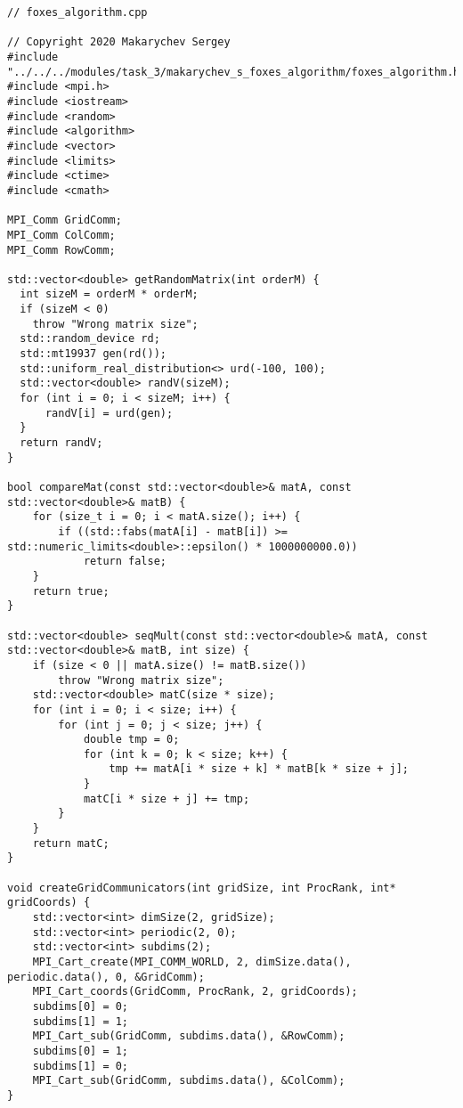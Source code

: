 \documentclass{report}
\begin{document}
\begin{lstlisting}
// foxes_algorithm.cpp

// Copyright 2020 Makarychev Sergey
#include "../../../modules/task_3/makarychev_s_foxes_algorithm/foxes_algorithm.h"
#include <mpi.h>
#include <iostream>
#include <random>
#include <algorithm>
#include <vector>
#include <limits>
#include <ctime>
#include <cmath>

MPI_Comm GridComm;
MPI_Comm ColComm;
MPI_Comm RowComm;

std::vector<double> getRandomMatrix(int orderM) {
  int sizeM = orderM * orderM;
  if (sizeM < 0)
    throw "Wrong matrix size";
  std::random_device rd;
  std::mt19937 gen(rd());
  std::uniform_real_distribution<> urd(-100, 100);
  std::vector<double> randV(sizeM);
  for (int i = 0; i < sizeM; i++) {
      randV[i] = urd(gen);
  }
  return randV;
}

bool compareMat(const std::vector<double>& matA, const std::vector<double>& matB) {
    for (size_t i = 0; i < matA.size(); i++) {
        if ((std::fabs(matA[i] - matB[i]) >= std::numeric_limits<double>::epsilon() * 1000000000.0))
            return false;
    }
    return true;
}

std::vector<double> seqMult(const std::vector<double>& matA, const std::vector<double>& matB, int size) {
    if (size < 0 || matA.size() != matB.size())
        throw "Wrong matrix size";
    std::vector<double> matC(size * size);
    for (int i = 0; i < size; i++) {
        for (int j = 0; j < size; j++) {
            double tmp = 0;
            for (int k = 0; k < size; k++) {
                tmp += matA[i * size + k] * matB[k * size + j];
            }
            matC[i * size + j] += tmp;
        }
    }
    return matC;
}

void createGridCommunicators(int gridSize, int ProcRank, int* gridCoords) {
    std::vector<int> dimSize(2, gridSize);
    std::vector<int> periodic(2, 0);
    std::vector<int> subdims(2);
    MPI_Cart_create(MPI_COMM_WORLD, 2, dimSize.data(), periodic.data(), 0, &GridComm);
    MPI_Cart_coords(GridComm, ProcRank, 2, gridCoords);
    subdims[0] = 0;
    subdims[1] = 1;
    MPI_Cart_sub(GridComm, subdims.data(), &RowComm);
    subdims[0] = 1;
    subdims[1] = 0;
    MPI_Cart_sub(GridComm, subdims.data(), &ColComm);
}



\end{lstlisting}
\end{document}
